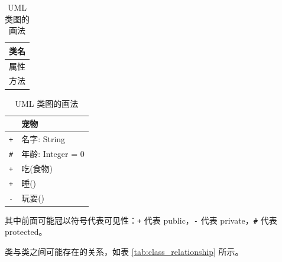 \documentclass[UTF8]{ctexart}
\begin{document}
\begin{table}[htb]
    \centering
    \begin{minipage}[c]{.49\textwidth}
        \centering
        \vspace{0pt}
        \begin{tabular}{|c|}
        \hline
            类名 \\
        \hline  
            属性 \\
        \hline
            方法 \\
        \hline
        \end{tabular}
    \end{minipage}
    \begin{minipage}[c]{.49\textwidth}
        \centering
        \vspace{0pt}
        \begin{tabular}{|ll|}
        \hline
            & 宠物 \\
        \hline
            \verb!+! & 名字: String \\
            \verb!#! & 年龄: Integer = 0 \\
        \hline
            \verb!+! & 吃(食物) \\
            \verb!+! & 睡() \\
            \verb!-! & 玩耍() \\
        \hline
        \end{tabular}
    \end{minipage}
    \caption{UML 类图的画法}\label{tab:UML-class}
\end{table}

其中前面可能冠以符号代表可见性：\verb!+! 代表 public，\verb!-! 代表 private，\verb!#! 代表 protected。

类与类之间可能存在的关系，如表 \ref{tab:class_relationship} 所示。
\end{document}
